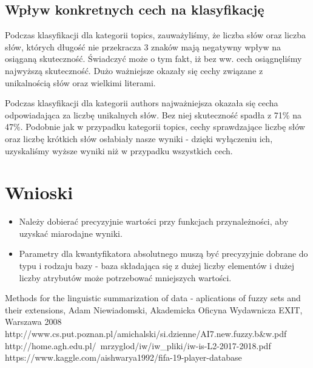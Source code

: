 \documentclass{classrep}
\begin{document}
\subsection{Wpływ konkretnych cech na klasyfikację}
Podczas klasyfikacji dla kategorii topics, zauważyliśmy, że liczba słów oraz liczba słów, których długość nie przekracza 3 znaków mają negatywny wpływ na osiąganą skuteczność. Świadczyć może o tym fakt, iż bez ww. cech osiągnęliśmy najwyższą skuteczność. Dużo ważniejsze okazały się cechy związane z unikalnością słów oraz wielkimi literami. \newline

Podczas klasyfikacji dla kategorii authors najważniejsza okazała się cecha odpowiadająca za liczbę unikalnych słów. Bez niej skuteczność spadła z 71\% na 47\%. Podobnie jak w przypadku kategorii topics, cechy sprawdzające liczbę słów oraz liczbę krótkich słów osłabiały nasze wyniki - dzięki wyłączeniu ich, uzyskaliśmy wyższe wyniki niż w przypadku wszystkich cech. 

	
\section{Wnioski}
\begin{itemize}
	\item Należy dobierać precyzyjnie wartości przy funkcjach przynależności, aby uzyskać miarodajne wyniki.
	\item Parametry dla kwantyfikatora absolutnego muszą być precyzyjnie dobrane do typu i rodzaju bazy - baza składająca się z dużej liczby elementów i dużej liczby atrybutów może potrzebować mniejszych wartości. 
\end{itemize}

	

\begin{thebibliography}{}
Methods for the linguistic summarization of data - aplications of fuzzy sets and their extensions, Adam Niewiadomski, Akademicka Oficyna Wydawnicza EXIT, Warszawa 2008
http://www.cs.put.poznan.pl/amichalski/si.dzienne/AI7.new.fuzzy.b\&w.pdf
http://home.agh.edu.pl/~mrzyglod/iw/iw\_pliki/iw-is-L2-2017-2018.pdf
https://www.kaggle.com/aishwarya1992/fifa-19-player-database
\end{thebibliography}
\end{document}
